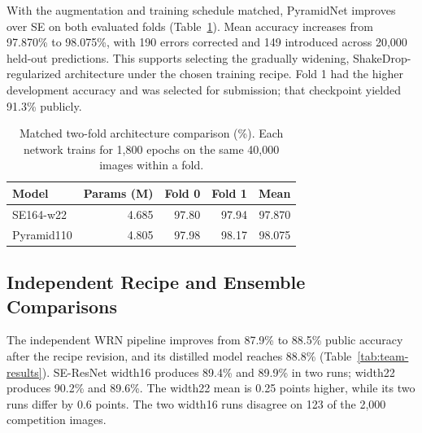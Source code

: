 \documentclass[letterpaper]{article} %
\begin{document}
With the augmentation and training schedule matched, PyramidNet improves over SE on both evaluated folds (Table~\ref{tab:pyramid}). Mean accuracy increases from 97.870\% to 98.075\%, with 190 errors corrected and 149 introduced across 20,000 held-out predictions. This supports selecting the gradually widening, ShakeDrop-regularized architecture under the chosen training recipe. Fold 1 had the higher development accuracy and was selected for submission; that checkpoint yielded 91.3\% publicly.

\begin{table}[tb]
\centering\small
\begin{tabular}{lrrrr}
\toprule
Model & Params (M) & Fold 0 & Fold 1 & Mean\\
\midrule
SE164-w22 & 4.685 & 97.80 & 97.94 & 97.870\\
Pyramid110 & 4.805 & 97.98 & 98.17 & 98.075\\
\bottomrule
\end{tabular}
\caption{Matched two-fold architecture comparison (\%). Each network trains for 1,800 epochs on the same 40,000 images within a fold.}
\label{tab:pyramid}
\end{table}

\subsection{Independent Recipe and Ensemble Comparisons}
The independent WRN pipeline improves from 87.9\% to 88.5\% public accuracy after the recipe revision, and its distilled model reaches 88.8\% (Table~\ref{tab:team-results}). SE-ResNet width16 produces 89.4\% and 89.9\% in two runs; width22 produces 90.2\% and 89.6\%. The width22 mean is 0.25 points higher, while its two runs differ by 0.6 points. The two width16 runs disagree on 123 of the 2,000 competition images.
\end{document}

